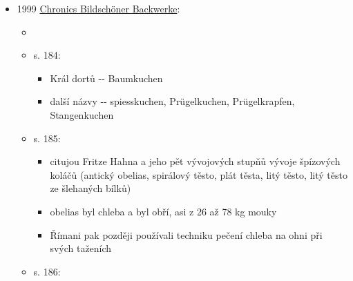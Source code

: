 \begin{itemize}
  \begin{itemize}
  \tightlist
  \item
  \item
    s. 49:

    \begin{itemize}
    \tightlist
    \item
      o koláčích z bílý mouky, do konce 19. století se pekly jen při
      větších oslavách, podle oslav měly i názvy, třeba svatební,
      radostník, bolestník, baba, calta, pleteník, paska
    \item
      v posledních 70 letech v důsledku zvyšování životní úrovně a
      působení městské kuchyně i na venkově zdomácněly novější druhy
      koláčů jako makovník, tvarožník, záviny, štrůdly.
    \item
      Moravského původu jsou tzv. brány a trdelníky.
    \item
      svítky, palačinky a vdolky se patrně rozšířily po první světový
      válce působením městský kuchyně a kuchařských knih. Totéž platí o
      zákuscích a dortech.
    \end{itemize}
  \end{itemize}
\item
  1999
  \href{https://web.archive.org/web/20131231064810/http://kurtos.eu/dl/Chronik_bildschoner_Backwerke.pdf}{Chronics
  Bildschöner Backwerke}:

  \begin{itemize}
  \tightlist
  \item
  \item
    s. 184:

    \begin{itemize}
    \tightlist
    \item
      Král dortů -\/- Baumkuchen
    \item
      další názvy -\/- spiesskuchen, Prügelkuchen, Prügelkrapfen,
      Stangenkuchen
    \end{itemize}
  \item
    s. 185:

    \begin{itemize}
    \tightlist
    \item
      citujou Fritze Hahna a jeho pět vývojových stupňů vývoje špízových
      koláčů (antický obelias, spirálový těsto, plát těsta, litý těsto,
      litý těsto ze šlehaných bílků)
    \item
      obelias byl chleba a byl obří, asi z 26 až 78 kg mouky
    \item
      Římani pak později používali techniku pečení chleba na ohni při
      svých taženích
    \end{itemize}
  \item
    s. 186:


\end{itemize}
\end{itemize}
